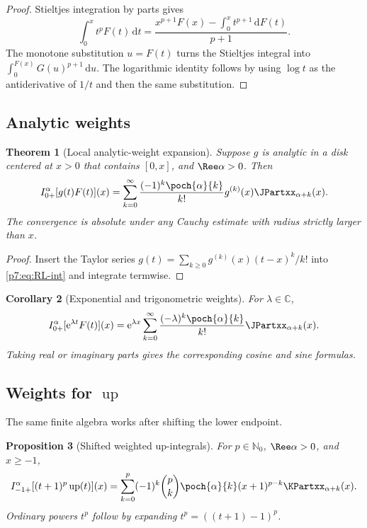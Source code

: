 \documentclass[11pt,oneside]{article}
\newtheorem{theorem}{Theorem}[section]
\newtheorem{proposition}[theorem]{Proposition}
\newtheorem{corollary}[theorem]{Corollary}
\theoremstyle{definition}
\theoremstyle{remark}
\newcommand{\Up}{\operatorname{up}}
\newcommand{\C}{\mathbb C}
\newcommand{\N}{\mathbb N}
\newcommand{\dd}{\,\mathrm d}
\newcommand{\e}{\mathrm e}
\newcommand{\1}{\mathbf 1}
\begin{document}
\begin{proof}
Stieltjes integration by parts gives
\[
 \int_0^xt^pF(t)\dd t
 =\frac{x^{p+1}F(x)-\int_0^xt^{p+1}\dd F(t)}{p+1}.
\]
The monotone substitution $u=F(t)$ turns the Stieltjes integral into
$\int_0^{F(x)}G(u)^{p+1}\dd u$.  The logarithmic identity follows by using
$\log t$ as the antiderivative of $1/t$ and then the same substitution.
\end{proof}

\subsection{Analytic weights}

\begin{theorem}[Local analytic-weight expansion]
\label{p7:thm:analytic-weight}
Suppose $g$ is analytic in a disk centered at $x>0$ that contains $[0,x]$, and
$\Ree\alpha>0$.  Then
\begin{equation}
 I_{0+}^{\alpha}[g(t)F(t)](x)
 =\sum_{k=0}^{\infty}\frac{(-1)^k\poch{\alpha}{k}}{k!}
 g^{(k)}(x)\JPartxx_{\alpha+k}(x).
 \label{p7:eq:analytic-weight}
\end{equation}
The convergence is absolute under any Cauchy estimate with radius strictly larger than $x$.
\end{theorem}

\begin{proof}
Insert the Taylor series
$g(t)=\sum_{k\ge0}g^{(k)}(x)(t-x)^k/k!$ into \cref{p7:eq:RL-int} and integrate termwise.
\end{proof}

\begin{corollary}[Exponential and trigonometric weights]
For $\lambda\in\C$,
\begin{equation}
 I_{0+}^{\alpha}[\e^{\lambda t}F(t)](x)
 =\e^{\lambda x}\sum_{k=0}^{\infty}
 \frac{(-\lambda)^k\poch{\alpha}{k}}{k!}\JPartxx_{\alpha+k}(x).
 \label{p7:eq:exponential-weight}
\end{equation}
Taking real or imaginary parts gives the corresponding cosine and sine formulas.
\end{corollary}

\subsection{Weights for $\Up$}

The same finite algebra works after shifting the lower endpoint.

\begin{proposition}[Shifted weighted up-integrals]
\label{p7:prop:up-weighted}
For $p\in\N_0$, $\Ree\alpha>0$, and $x\ge-1$,
\begin{equation}
 I_{-1+}^{\alpha}[(t+1)^p\Up(t)](x)
 =\sum_{k=0}^{p}(-1)^k\binom pk\poch{\alpha}{k}
 (x+1)^{p-k}\KPartxx_{\alpha+k}(x).
 \label{p7:eq:up-weighted}
\end{equation}
Ordinary powers $t^p$ follow by expanding $t^p=((t+1)-1)^p$.
\end{proposition}
\end{document}
